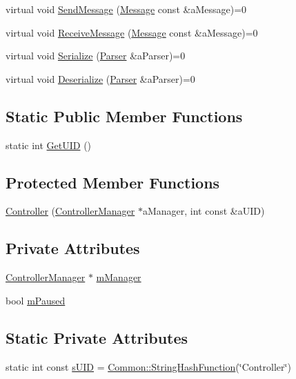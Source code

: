 \begin{DoxyCompactItemize}
\item 
virtual void \hyperlink{classController_a4f1e140db32aa50927565e22b1abe8cd}{Send\+Message} (\hyperlink{classMessage}{Message} const \&a\+Message)=0
\item 
virtual void \hyperlink{classController_a9ac0b86e4b71abdafb61f542165d3e87}{Receive\+Message} (\hyperlink{classMessage}{Message} const \&a\+Message)=0
\item 
virtual void \hyperlink{classController_ac5ce7c4254d4b565f9630f710e7f8de5}{Serialize} (\hyperlink{classParser}{Parser} \&a\+Parser)=0
\item 
virtual void \hyperlink{classController_acf414fa790e19413ac4f83c5dc0f1744}{Deserialize} (\hyperlink{classParser}{Parser} \&a\+Parser)=0
\end{DoxyCompactItemize}
\subsection*{Static Public Member Functions}
\begin{DoxyCompactItemize}
\item 
static int \hyperlink{classController_a60cc51045e8f09c77c1ab6a565b06ca7}{Get\+U\+ID} ()
\end{DoxyCompactItemize}
\subsection*{Protected Member Functions}
\begin{DoxyCompactItemize}
\item 
\hyperlink{classController_a923bf71b7815ec077e7201e847e9a318}{Controller} (\hyperlink{classControllerManager}{Controller\+Manager} $\ast$a\+Manager, int const \&a\+U\+ID)
\end{DoxyCompactItemize}
\subsection*{Private Attributes}
\begin{DoxyCompactItemize}
\item 
\hyperlink{classControllerManager}{Controller\+Manager} $\ast$ \hyperlink{classController_a5c056702c6a5955ba8a042b3ac073976}{m\+Manager}
\item 
bool \hyperlink{classController_ad10c68360c0064b3c6231b4a7e86845f}{m\+Paused}
\end{DoxyCompactItemize}
\subsection*{Static Private Attributes}
\begin{DoxyCompactItemize}
\item 
static int const \hyperlink{classController_a21bfc63815a3008d5e4f095a3494bf18}{s\+U\+ID} = \hyperlink{namespaceCommon_a994c43a8ea7b03968186a635687a6521}{Common\+::\+String\+Hash\+Function}(\char`\"{}Controller\char`\"{})
\end{DoxyCompactItemize}


